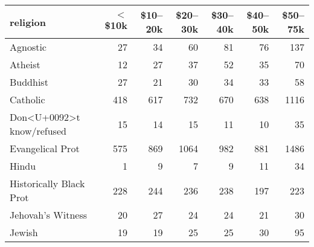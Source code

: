 \begin{tabular}{lrrrrrr}
  \toprule
 religion & $<$\$10k & \$10--20k & \$20--30k & \$30--40k & \$40--50k & \$50--75k \\ 
  \midrule
  Agnostic &  27 &  34 &  60 &  81 &  76 & 137 \\ 
  Atheist &  12 &  27 &  37 &  52 &  35 &  70 \\ 
  Buddhist &  27 &  21 &  30 &  34 &  33 &  58 \\ 
  Catholic & 418 & 617 & 732 & 670 & 638 & 1116 \\ 
  Don<U+0092>t know/refused &  15 &  14 &  15 &  11 &  10 &  35 \\ 
  Evangelical Prot & 575 & 869 & 1064 & 982 & 881 & 1486 \\ 
  Hindu &   1 &   9 &   7 &   9 &  11 &  34 \\ 
  Historically Black Prot & 228 & 244 & 236 & 238 & 197 & 223 \\ 
  Jehovah's Witness &  20 &  27 &  24 &  24 &  21 &  30 \\ 
  Jewish &  19 &  19 &  25 &  25 &  30 &  95 \\ 
   \bottomrule
\end{tabular}
